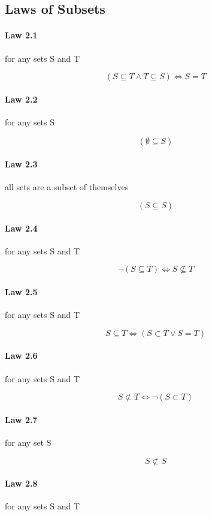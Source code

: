 \documentclass[twocolumn]{article}
\begin{document}
\subsection{Laws of Subsets}

\paragraph{Law 2.1} for any sets S and T

$$ (S  \subseteq  T \wedge T  \subseteq  S) \iff S = T $$

\paragraph{Law 2.2} for any sets S

$$ ( \emptyset   \subseteq  S) $$

\paragraph{Law 2.3} all sets are a subset of themselves

$$ (S  \subseteq  S) $$

\paragraph{Law 2.4} for any sets S and T

$$ \neg(S  \subseteq  T) \iff S  \not\subseteq  T $$

\paragraph{Law 2.5} for any sets S and T

$$ S  \subseteq  T \iff (S  \subset  T \vee S = T) $$

\paragraph{Law 2.6} for any sets S and T

$$ S \not\subset T \iff \neg(S  \subset  T) $$

\paragraph{Law 2.7} for any set S

$$ S \not\subset S  $$

\paragraph{Law 2.8} for any sets S and T
\end{document}
